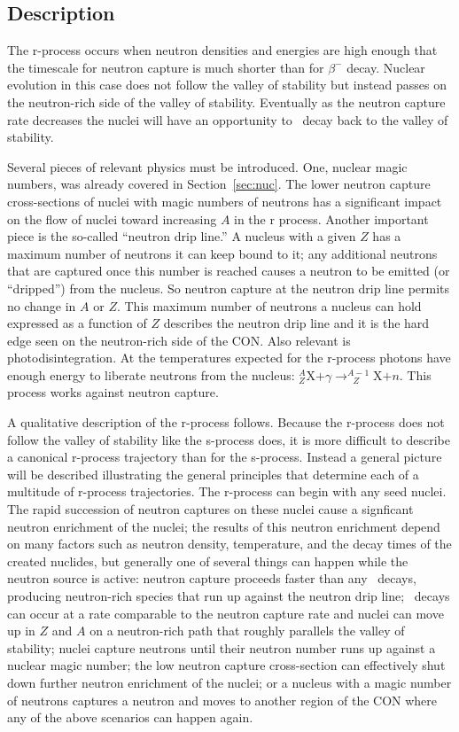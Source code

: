 \label{sec:r}
\subsection{Description}

The r-process occurs when neutron
densities and energies are high enough that the timescale for
neutron capture is much shorter than for $\beta^-$ decay.  Nuclear
evolution in this case does not follow the valley of stability but
instead passes on the neutron-rich side of the valley of stability.
Eventually as the neutron capture rate decreases the nuclei will have
an opportunity to \bminus\ decay back to the valley of stability.

Several pieces of relevant physics must be introduced.  One, nuclear
magic numbers, was already covered in Section~\ref{sec:nuc}.  The
lower neutron capture cross-sections of nuclei with magic numbers of
neutrons has a significant impact on the flow of nuclei toward
increasing $A$ in the r process.  Another important piece 
 is the so-called
``neutron drip line.''  A nucleus with a given $Z$ has a maximum
number of neutrons it can keep bound to it; any additional neutrons
that are captured once this number is reached causes a neutron to be
emitted (or ``dripped'') from the nucleus.  So neutron capture at 
the neutron drip line permits no change in $A$ or $Z$.  
This maximum number of neutrons a nucleus can hold expressed as a
function of $Z$ describes the neutron drip line and it is the hard
edge seen on the neutron-rich side of the CON.  Also relevant is
photodisintegration.  At the temperatures expected for the r-process
photons have enough energy to liberate neutrons from the nucleus:
$^A_Z$X$+\gamma \rightarrow _{\ \ \ Z}^{A-1}$X$+n$.  This process
works against neutron capture.

A qualitative description of the r-process follows.  Because the 
r-process does not follow the valley of stability like the
s-process does, it is more difficult to describe a canonical r-process
trajectory than for the s-process.  Instead a general picture
will be described illustrating the general principles that determine
each of a multitude of r-process trajectories.  The r-process can
begin with any seed nuclei.  The
rapid succession of neutron captures on these nuclei cause a
signficant neutron enrichment of the nuclei; the results of this
neutron enrichment depend on many factors such as neutron density,
temperature, and the decay times of the created nuclides, but
generally one of several things can happen while the neutron source is
active: neutron capture proceeds
faster than any \bminus\ decays, producing neutron-rich species that
run up against the neutron drip line; \bminus\ decays can occur at a
rate comparable to the neutron capture rate and nuclei can move up in
$Z$ and $A$ on a neutron-rich path that roughly parallels the valley 
of stability; nuclei capture neutrons until their neutron number 
runs up against a nuclear magic number; the low neutron capture
cross-section can effectively shut down further neutron enrichment of
the nuclei; or a nucleus with a magic number of neutrons captures a
neutron and moves to another region of the CON where any of the above
scenarios can happen again.


